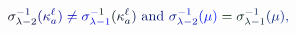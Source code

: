\documentclass[12pt]{article}
\begin{document}
\makeatletter
\renewcommand*{\@textcolor}[3]{%
  \protect\leavevmode
  \begingroup
    \color#1{#2}#3%
  \endgroup
}
\makeatother
\begin{displaymath}
\mathcolor[RGB]{0,0,15}{\sigma} _ { \mathcolor[RGB]{0,0,30}{\lambda} \mathcolor[RGB]{0,0,45}{-} \mathcolor[RGB]{0,0,60}{2} } ^ { \mathcolor[RGB]{0,0,75}{-} \mathcolor[RGB]{0,0,90}{1} } \mathcolor[RGB]{0,0,105}{(} \mathcolor[RGB]{0,0,120}{\kappa} _ { \mathcolor[RGB]{0,0,135}{a} } ^ { \mathcolor[RGB]{0,0,150}{\ell} } \mathcolor[RGB]{0,0,165}{)} \mathcolor[RGB]{0,0,180}{\neq} \mathcolor[RGB]{0,0,195}{\sigma} _ { \mathcolor[RGB]{0,0,210}{\lambda} \mathcolor[RGB]{0,0,225}{-} \mathcolor[RGB]{0,0,240}{1} } ^ { \mathcolor[RGB]{0,0,255}{-} \mathcolor[RGB]{0,15,0}{1} } \mathcolor[RGB]{0,15,15}{(} \mathcolor[RGB]{0,15,30}{\kappa} _ { \mathcolor[RGB]{0,15,45}{a} } ^ { \mathcolor[RGB]{0,15,60}{\ell} } \mathcolor[RGB]{0,15,75}{)} \mathrm { ~ \mathcolor[RGB]{0,15,90}{a} \mathcolor[RGB]{0,15,105}{n} \mathcolor[RGB]{0,15,120}{d} ~ } \mathcolor[RGB]{0,15,135}{\sigma} _ { \mathcolor[RGB]{0,15,150}{\lambda} \mathcolor[RGB]{0,15,165}{-} \mathcolor[RGB]{0,15,180}{2} } ^ { \mathcolor[RGB]{0,15,195}{-} \mathcolor[RGB]{0,15,210}{1} } \mathcolor[RGB]{0,15,225}{(} \mathcolor[RGB]{0,15,240}{\mu} \mathcolor[RGB]{0,15,255}{)} \mathcolor[RGB]{0,30,0}{=} \mathcolor[RGB]{0,30,15}{\sigma} _ { \mathcolor[RGB]{0,30,30}{\lambda} \mathcolor[RGB]{0,30,45}{-} \mathcolor[RGB]{0,30,60}{1} } ^ { \mathcolor[RGB]{0,30,75}{-} \mathcolor[RGB]{0,30,90}{1} } \mathcolor[RGB]{0,30,105}{(} \mathcolor[RGB]{0,30,120}{\mu} \mathcolor[RGB]{0,30,135}{)} \mathcolor[RGB]{0,30,150}{,}
\end{displaymath}
\end{document}
